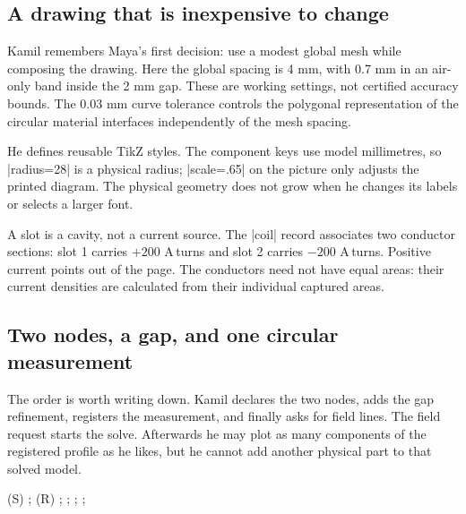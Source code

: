 \subsection{A drawing that is inexpensive to change}

Kamil remembers Maya's first decision: use a modest global mesh while composing
the drawing. Here the global spacing is 4 mm, with 0.7 mm in an air-only band
inside the 2 mm gap. These are working settings, not certified accuracy bounds.
The 0.03 mm curve tolerance controls the polygonal representation of the
circular material interfaces independently of the mesh spacing.

He defines reusable TikZ styles. The component keys use model millimetres,
so |radius=28| is a physical radius; |scale=.65| on the picture only adjusts
the printed diagram. The physical geometry does not grow when he changes its
labels or selects a larger font.

\begin{codeexample}
\end{codeexample}

A slot is a cavity, not a current source. The |coil| record associates two
conductor sections: slot 1 carries $+200$ A\,turns and slot 2 carries
$-200$ A\,turns. Positive current points out of the page. The conductors need
not have equal areas: their current densities are calculated from their
individual captured areas.

\subsection{Two nodes, a gap, and one circular measurement}

The order is worth writing down. Kamil declares the two nodes, adds the gap
refinement, registers the measurement, and finally asks for field lines.
The field request starts the solve. Afterwards he may plot as many components
of the registered profile as he likes, but he cannot add another physical
part to that solved model.

\begin{codeexample}
 (S) {};
 (R) {};
;
;
;
\end{codeexample}


